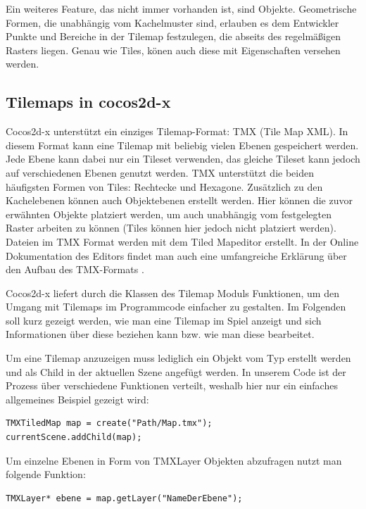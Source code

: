 Ein weiteres Feature, das nicht immer vorhanden ist, sind Objekte. Geometrische Formen, die unabhängig vom Kachelmuster sind, erlauben es dem Entwickler Punkte und Bereiche in der Tilemap festzulegen, die abseits des regelmäßigen Rasters liegen. Genau wie Tiles, könen auch diese mit Eigenschaften versehen werden.

\subsection{Tilemaps in cocos2d-x}
Cocos2d-x unterstützt ein einziges Tilemap-Format: TMX (Tile Map XML). In diesem Format kann eine Tilemap mit beliebig vielen Ebenen gespeichert werden. Jede Ebene kann dabei nur ein Tileset verwenden, das gleiche Tileset kann jedoch auf verschiedenen Ebenen genutzt werden. TMX unterstützt die beiden häufigsten Formen von Tiles: Rechtecke und Hexagone. 
Zusätzlich zu den Kachelebenen können auch Objektebenen erstellt werden. Hier können die zuvor erwähnten Objekte platziert werden, um auch unabhängig vom festgelegten Raster arbeiten zu können (Tiles können hier jedoch nicht platziert werden).
Dateien im TMX Format werden mit dem Tiled Mapeditor erstellt. In der Online Dokumentation des Editors findet man auch eine umfangreiche Erklärung über den Aufbau des TMX-Formats \cite{TiledDocFormat}.

Cocos2d-x liefert durch die Klassen des Tilemap Moduls Funktionen, um den Umgang mit Tilemaps im Programmcode einfacher zu gestalten. Im Folgenden soll kurz gezeigt werden, wie man eine Tilemap im Spiel anzeigt und sich Informationen über diese beziehen kann bzw. wie man diese bearbeitet.

Um eine Tilemap anzuzeigen muss lediglich ein Objekt vom Typ  erstellt werden und als Child in der aktuellen Szene angefügt werden. In unserem Code ist der Prozess über verschiedene Funktionen verteilt, weshalb hier nur ein einfaches allgemeines Beispiel gezeigt wird:

\begin{lstlisting}[style=singleline]
TMXTiledMap map = create("Path/Map.tmx");
currentScene.addChild(map);
\end{lstlisting}

Um einzelne Ebenen in Form von TMXLayer Objekten abzufragen nutzt man folgende Funktion:

\begin{lstlisting}[style=singleline]
TMXLayer* ebene = map.getLayer("NameDerEbene");
\end{lstlisting}

